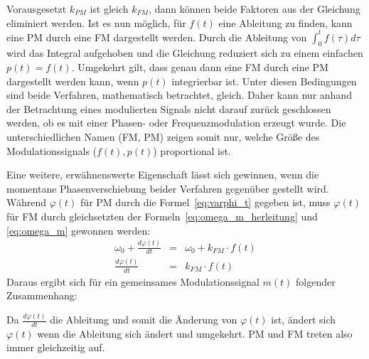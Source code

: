 Vorausgesetzt \(k_{PM}\) ist gleich \(k_{FM}\), dann können beide Faktoren aus der Gleichung eliminiert werden. Ist es nun möglich, für \(f(t)\) eine Ableitung zu finden, kann eine PM durch eine FM dargestellt werden. Durch die Ableitung von \(\int_0^t{f(\tau)}d\tau\) wird das Integral aufgehoben und die Gleichung reduziert sich zu einem einfachen \(p(t)=f(t)\). Umgekehrt gilt, dass genau dann eine FM durch eine PM dargestellt werden kann, wenn \(p(t)\) integrierbar ist. Unter diesen Bedingungen sind beide Verfahren, mathematisch betrachtet, gleich. Daher kann nur anhand der Betrachtung eines modulierten Signals nicht darauf zurück geschlossen werden, ob es mit einer Phasen- oder Frequenzmodulation erzeugt wurde. Die unterschiedlichen Namen (FM, PM) zeigen somit nur, welche Größe des Modulationssignals (\(f(t), p(t)\)) proportional ist. \cite[S. 210]{lathi}

Eine weitere, erwähnenswerte Eigenschaft lässt sich gewinnen, wenn die momentane Phasenverschiebung beider Verfahren gegenüber gestellt wird. Während \(\varphi(t)\) für PM durch die Formel~\ref{eq:varphi_t} gegeben ist, muss \(\varphi(t)\) für FM durch gleichsetzten der Formeln~\ref{eq:omega_m_herleitung} und \ref{eq:omega_m} gewonnen werden:
\begin{eqnarray*}
\omega_0+\frac{d\varphi(t)}{dt}&=&\omega_0+k_{FM}\cdot f(t) \\
\frac{d\varphi(t)}{dt}&=&k_{FM}\cdot f(t)
\end{eqnarray*}
Daraus ergibt sich für ein gemeinsames Modulationssignal \(m(t)\) folgender Zusammenhang:
\begin{center}
\end{center}
Da $\frac{d\varphi(t)}{dt}$ die Ableitung und somit die Änderung von $\varphi(t)$ ist, ändert sich $\varphi(t)$ wenn die Ableitung sich ändert und umgekehrt. PM und FM treten also immer gleichzeitig auf.

